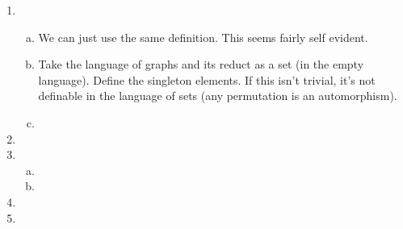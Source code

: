 \begin{enumerate}
%	
%	
%	
\item 
	\begin{enumerate}[a)]
	\item We can just use the same definition. This seems fairly self evident. 
	
	\item Take the language of graphs and its reduct as a set (in the empty language). Define the singleton elements. If this isn't trivial, it's not definable in the language of sets (any permutation is an automorphism). 
	
	\item %
	
	\end{enumerate}

\item %
\item 
	\begin{enumerate}[a)]
	\item
	
	\item
	
	\end{enumerate}
\item 
\item 

\end{enumerate}
